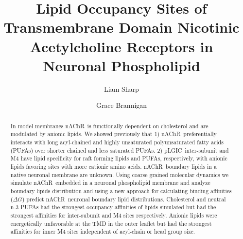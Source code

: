 \documentclass[preprint,3p,9pt,times,onecolumn]{elsarticle}
\newcommand{\nachr}{nAChR}
\newcommand{\plgic}{pLGIC}
\begin{document}
\begin{frontmatter}



\title{Lipid Occupancy Sites of Transmembrane Domain Nicotinic Acetylcholine Receptors in Neuronal Phospholipid}



\author[ccib]{Liam Sharp} 
\author[ccib,physics]{Grace Brannigan}
\address[ccib]{Center for Computational and Integrative Biology, Rutgers University-Camden, Camden, NJ}
\address[physics]{Department of Physics, Rutgers University-Camden, Camden, NJ}

\begin{abstract}
In model membranes \nachr~is functionally dependent on cholesterol and are modulated by anionic lipids. We showed previously that 1) \nachr~preferentially interacts with long acyl-chained and highly unsaturated polyunsaturated fatty acids (PUFAs) over shorter chained and less saturated PUFAs. 2) \plgic~inter-subunit and M4 have lipid specificity for raft forming lipids and PUFAs, respectively, with anionic lipids favoring sites with more cationic amino acids.  \nachr~boundary lipids in a native neuronal membrane are unknown. Using coarse grained molecular dynamics we simulate \nachr~embedded in a neuronal phospholipid membrane and analyze boundary lipids distribution and using a new approach for calculating binding affinities ($\Delta G$) predict \nachr~neuronal boundary lipid distributions. Cholesterol and neutral n-3 PUFAs had the strongest occupancy affinities of lipids simulated but had the strongest affinities for inter-subunit and M4 sites respectively. Anionic lipids were energetically unfavorable at the TMD in the outer leaflet but had the strongest affinities for inner M4 sites independent of acyl-chain or head group size. 


\end{abstract}
\end{frontmatter}
\end{document}
